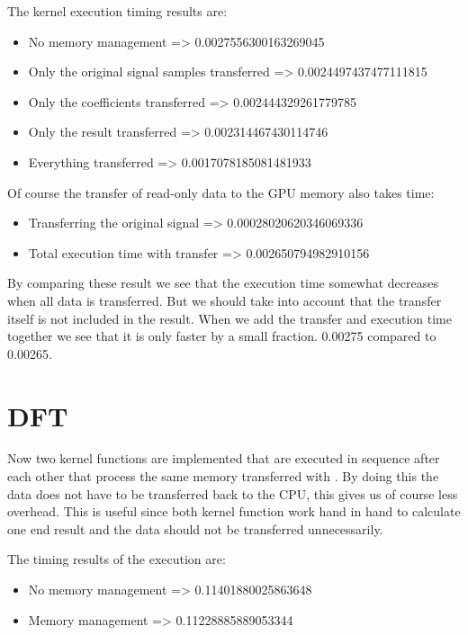 The kernel execution timing results are:
\begin{itemize}
    \item No memory management => 0.0027556300163269045
    \item Only the original signal samples transferred => 0.0024497437477111815
    \item Only the coefficients transferred => 0.002444329261779785
    \item Only the result transferred => 0.002314467430114746
    \item Everything transferred => 0.0017078185081481933
\end{itemize}

Of course the transfer of read-only data to the GPU memory also takes time:
\begin{itemize}
    \item Transferring the original signal => 0.00028020620346069336
    \item Total execution time with transfer => 0.002650794982910156
\end{itemize}

By comparing these result we see that the execution time somewhat decreases when all data is transferred. But we should take into account that the transfer itself is not included in the result. When we add the transfer and execution time together we see that it is only faster by a small fraction. 0.00275 compared to 0.00265.

\newpage

\section{DFT}
\label{sec:DFT}

Now two kernel functions are implemented that are executed in sequence after each other that process the same memory transferred with . By doing this the data does not have to be transferred back to the CPU, this gives us of course less overhead. This is useful since both kernel function work hand in hand to calculate one end result and the data should not be transferred unnecessarily.

The timing results of the execution are:
\begin{itemize}
    \item No memory management => 0.11401880025863648
    \item Memory management => 0.11228885889053344
\end{itemize}


